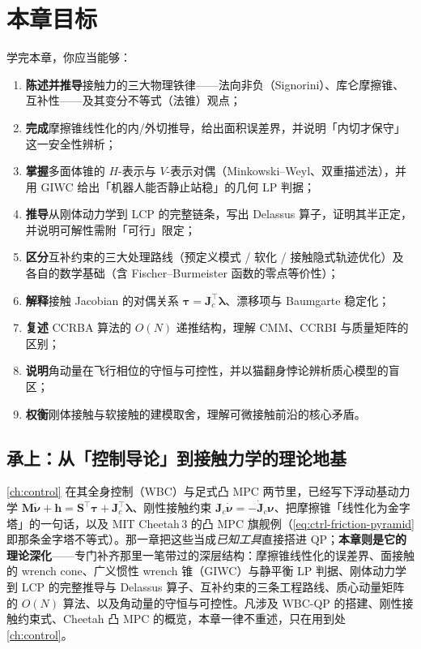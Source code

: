 \section*{本章目标}
学完本章，你应当能够：
\begin{enumerate}
  \item \textbf{陈述并推导}接触力的三大物理铁律——法向非负（Signorini）、库仑摩擦锥、互补性——及其变分不等式（法锥）观点；
  \item \textbf{完成}摩擦锥线性化的内/外切推导，给出面积误差界，并说明「内切才保守」这一安全性辨析；
  \item \textbf{掌握}多面体锥的 $H$-表示与 $V$-表示对偶（Minkowski--Weyl、双重描述法），并用 GIWC 给出「机器人能否静止站稳」的几何 LP 判据；
  \item \textbf{推导}从刚体动力学到 LCP 的完整链条，写出 Delassus 算子，证明其半正定，并说明可解性需附「可行」限定；
  \item \textbf{区分}互补约束的三大处理路线（预定义模式 / 软化 / 接触隐式轨迹优化）及各自的数学基础（含 Fischer--Burmeister 函数的零点等价性）；
  \item \textbf{解释}接触 Jacobian 的对偶关系 $\boldsymbol{\tau}=\mathbf{J}_c^\top\boldsymbol{\lambda}$、漂移项与 Baumgarte 稳定化；
  \item \textbf{复述} CCRBA 算法的 $O(N)$ 递推结构，理解 CMM、CCRBI 与质量矩阵的区别；
  \item \textbf{说明}角动量在飞行相位的守恒与可控性，并以猫翻身悖论辨析质心模型的盲区；
  \item \textbf{权衡}刚体接触与软接触的建模取舍，理解可微接触前沿的核心矛盾。
\end{enumerate}

\subsection*{承上：从「控制导论」到接触力学的理论地基}
\cref{ch:control} 在其全身控制（WBC）与足式凸 MPC 两节里，已经写下浮动基动力学 $\mathbf{M}\dot{\boldsymbol{\nu}}+\boldsymbol{h}=\mathbf{S}^\top\boldsymbol{\tau}+\mathbf{J}_c^\top\boldsymbol{\lambda}$、刚性接触约束 $\mathbf{J}_c\dot{\boldsymbol{\nu}}=-\dot{\mathbf{J}}_c\boldsymbol{\nu}$、把摩擦锥「线性化为金字塔」的一句话，以及 MIT Cheetah\,3 的凸 MPC 旗舰例（\cref{eq:ctrl-friction-pyramid} 即那条金字塔不等式）。那一章把这些当成\emph{已知工具}直接搭进 QP；\textbf{本章则是它的理论深化}——专门补齐那里一笔带过的深层结构：摩擦锥线性化的误差界、面接触的 wrench cone、广义惯性 wrench 锥（GIWC）与静平衡 LP 判据、刚体动力学到 LCP 的完整推导与 Delassus 算子、互补约束的三条工程路线、质心动量矩阵的 $O(N)$ 算法、以及角动量的守恒与可控性。凡涉及 WBC-QP 的搭建、刚性接触约束式、Cheetah 凸 MPC 的概览，本章一律不重述，只在用到处 \cref{ch:control}。

